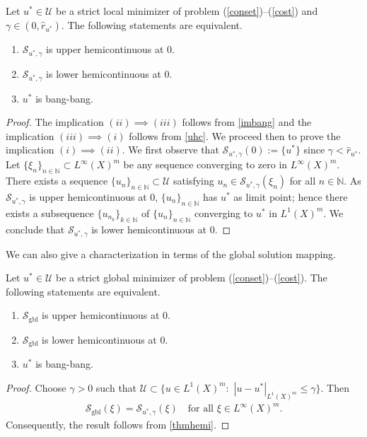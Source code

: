 \documentclass[hidelinks,onefignum,onetabnum]{siamart220329}
\begin{document}
\begin{theorem}\label{thmhemi}
	Let $u^*\in\mathcal U$ be a strict local minimizer of problem (\ref{conset})--(\ref{cost}) and $\gamma\in(0,\hat r_{u^*})$. The following statements are equivalent.
	\begin{enumerate}
		\item $\mathcal S_{u^*,\gamma}$ is upper hemicontinuous at $0$.
		
		\item $\mathcal S_{u^*,\gamma}$ is lower hemicontinuous at $0$.
		
		\item $u^*$ is bang-bang.
	\end{enumerate}
\end{theorem}
\begin{proof}
	The implication $(ii)\implies(iii)$ follows from \cref{imbang} and the implication  $(iii)\implies(i)$ follows from \cref{uhc}. We proceed then to prove the implication $(i)\implies(ii)$. We first observe that $\mathcal S_{u^*,\gamma}(0):=\{u^*\}$ since $\gamma<\hat r_{u^*}$. Let $\{\xi_n\}_{n\in\mathbb N}\subset L^\infty(X)^m$ be any sequence converging to zero in $L^\infty(X)^m$.  There exists a sequence $\{u_{n}\}_{n\in\mathbb N}\subset\mathcal U$ satisfying $u_n\in \mathcal S_{u^*,\gamma}(\xi_n)$ for all $n\in\mathbb N$. 
	As $\mathcal S_{u^*,\gamma}$ is upper hemicontinuous at $0$, $\{u_n\}_{n\in\mathbb N}$ has $u^*$ as limit point; hence there exists a subsequence $\{u_{n_k}\}_{k\in\mathbb N}$ of $\{u_n\}_{n\in\mathbb N}$ converging to $u^*$ in $L^1(X)^m$. We conclude that $\mathcal S_{u^*,\gamma}$ is lower hemicontinuous at $0$.
	
	
\end{proof}


We can also give a characterization in terms of the global solution mapping.

\begin{corollary}\label{corgbl}
	Let $u^*\in\mathcal U$ be a strict global minimizer of problem (\ref{conset})--(\ref{cost}). The following statements are equivalent.
	\begin{enumerate}
		\item $\mathcal S_{\text{gbl}}$ is upper hemicontinuous at $0$.
		
		\item $\mathcal S_{\text{gbl}}$ is lower hemicontinuous at $0$.
		
		\item $u^*$ is bang-bang.
	\end{enumerate}
\end{corollary}
\begin{proof}
	Choose $\gamma>0$ such that $\mathcal U\subset\{u\in L^1(X)^m:\,\, |u-u^*|_{L^1(X)^m}\le\gamma\}$. Then 
	\begin{align*}
		\mathcal S_{\text{gbl}}(\xi)=\mathcal S_{u^*,\gamma}(\xi)\quad\text{for all $\xi\in L^\infty(X)^m$}.
	\end{align*}
	Consequently, the result follows from \cref{thmhemi}.
\end{proof}
\end{document}
